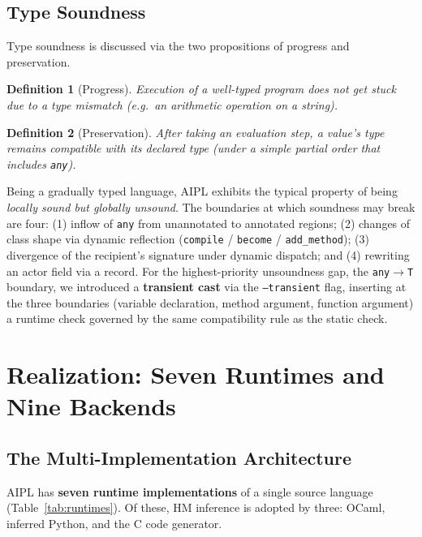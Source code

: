 \documentclass[11pt,a4paper]{article}
\newcommand{\code}[1]{\texttt{\small #1}}
\newtheorem{definition}{Definition}
\begin{document}
\subsection{Type Soundness}\label{sec:sound}
Type soundness is discussed via the two propositions of progress and
preservation.
\begin{definition}[Progress]
Execution of a well-typed program does not get stuck due to a type
mismatch (e.g.\ an arithmetic operation on a string).
\end{definition}
\begin{definition}[Preservation]
After taking an evaluation step, a value's type remains compatible with
its declared type (under a simple partial order that includes
\code{any}).
\end{definition}

Being a gradually typed language, AIPL exhibits the typical property of
being \emph{locally sound but globally unsound}. The boundaries at which
soundness may break are four: (1) inflow of \code{any} from unannotated
to annotated regions; (2) changes of class shape via dynamic reflection
(\code{compile} / \code{become} / \code{add\_method}); (3) divergence of
the recipient's signature under dynamic dispatch; and (4) rewriting an
actor field via a record. For the highest-priority unsoundness gap,
the \code{any}$\to$\code{T} boundary, we introduced a \textbf{transient
cast} via the \code{--transient} flag, inserting at the three boundaries
(variable declaration, method argument, function argument) a runtime
check governed by the same compatibility rule as the static check.

\section{Realization: Seven Runtimes and Nine Backends}\label{sec:impl}

\subsection{The Multi-Implementation Architecture}
AIPL has \textbf{seven runtime implementations} of a single source
language (Table~\ref{tab:runtimes}). Of these, HM inference is adopted by
three: OCaml, inferred Python, and the C code generator.
\end{document}
